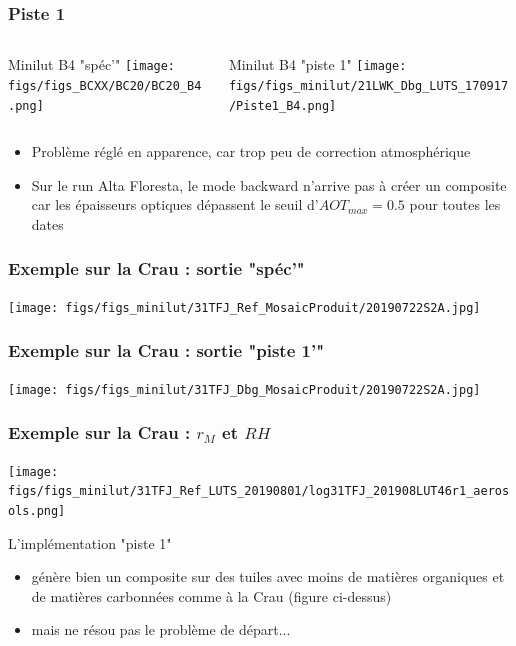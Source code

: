 \documentclass[8pt]{beamer}
\begin{document}
\begin{frame}
\frametitle{Piste 1}
	\begin{columns}
		\begin{column}{0.5\textwidth}
			\begin{center}
				Minilut B4 "spéc'"
		     	\texttt{[image: figs/figs\_BCXX/BC20/BC20\_B4.png]}
		    \end{center}		
		    
		\end{column}
		\begin{column}{0.5\textwidth}
			\begin{center}
				Minilut B4 "piste 1"	
				\texttt{[image: figs/figs\_minilut/21LWK\_Dbg\_LUTS\_170917/Piste1\_B4.png]}
		    \end{center}
		\end{column}
	\end{columns}
	\begin{itemize}
		\item Problème réglé en apparence, car trop peu de correction atmosphérique
		\item Sur le run Alta Floresta, le mode backward n'arrive pas à créer un composite car les épaisseurs optiques dépassent le seuil d'$AOT_{max} = 0.5$ pour toutes les dates
	\end{itemize}
\end{frame}

\begin{frame}
\frametitle{Exemple sur la Crau : sortie "spéc'"}
			\begin{center}
		     	\texttt{[image: figs/figs\_minilut/31TFJ\_Ref\_MosaicProduit/20190722S2A.jpg]}
		    \end{center}		
\end{frame}

\begin{frame}
\frametitle{Exemple sur la Crau : sortie "piste 1'"}
	\begin{center}
     	\texttt{[image: figs/figs\_minilut/31TFJ\_Dbg\_MosaicProduit/20190722S2A.jpg]}
    \end{center}		
\end{frame}

\begin{frame}
\frametitle{Exemple sur la Crau : $r_{M}$ et $RH$}
	\texttt{[image: figs/figs\_minilut/31TFJ\_Ref\_LUTS\_20190801/log31TFJ\_201908LUT46r1\_aerosols.png]}

	L'implémentation "piste 1"
	\begin{itemize}
		\item génère bien un composite sur des tuiles avec moins de matières organiques et de matières carbonnées comme à la Crau (figure ci-dessus)
		\item mais ne résou pas le problème de départ...
	\end{itemize}
\end{frame}
\end{document}
